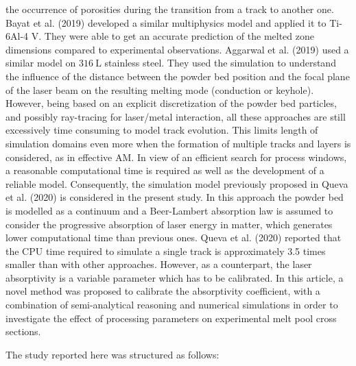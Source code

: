 \documentclass[10pt]{article}
\begin{document}
the occurrence of porosities during the transition from a track to another one. Bayat et al. (2019) developed a similar multiphysics model and applied it to Ti-6Al-4 V. They were able to get an accurate prediction of the melted zone dimensions compared to experimental observations. Aggarwal et al. (2019) used a similar model on $316 \mathrm{~L}$ stainless steel. They used the simulation to understand the influence of the distance between the powder bed position and the focal plane of the laser beam on the resulting melting mode (conduction or keyhole). However, being based on an explicit discretization of the powder bed particles, and possibly ray-tracing for laser/metal interaction, all these approaches are still excessively time consuming to model track evolution. This limits length of simulation domains even more when the formation of multiple tracks and layers is considered, as in effective AM. In view of an efficient search for process windows, a reasonable computational time is required as well as the development of a reliable model. Consequently, the simulation model previously proposed in Queva et al. (2020) is considered in the present study. In this approach the powder bed is modelled as a continuum and a Beer-Lambert absorption law is assumed to consider the progressive absorption of laser energy in matter, which generates lower computational time than previous ones. Queva et al. (2020) reported that the CPU time required to simulate a single track is approximately 3.5 times smaller than with other approaches. However, as a counterpart, the laser absorptivity is a variable parameter which has to be calibrated. In this article, a novel method was proposed to calibrate the absorptivity coefficient, with a combination of semi-analytical reasoning and numerical simulations in order to investigate the effect of processing parameters on experimental melt pool cross sections.

The study reported here was structured as follows:
\end{document}
